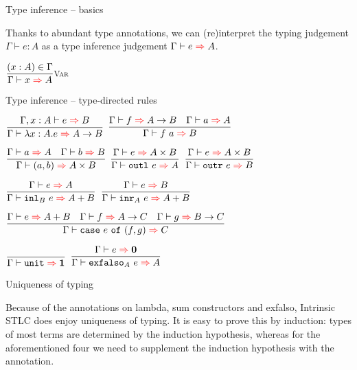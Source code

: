 \documentclass{beamer}
\newcommand{\Fun}[2]{#1 \to #2}
\newcommand{\Prod}[2]{#1 \times #2}
\newcommand{\Sum}[2]{#1 + #2}
\newcommand{\Unit}{\textbf{1}}
\newcommand{\Empty}{\textbf{0}}
\newcommand{\app}[2]{#1\ #2}
\newcommand{\pair}[2]{(#1, #2)}
\newcommand{\outl}[1]{\texttt{outl}\ #1}
\newcommand{\outr}[1]{\texttt{outr}\ #1}
\newcommand{\case}[3]{\texttt{case}\ #1\ \texttt{of}\ (#2, #3)}
\newcommand{\unit}{\texttt{unit}}
\newcommand{\fulltyping}[3]{#1 \vdash #2 : #3}
\newcommand{\rulename}[1]{\textsc{\footnotesize{#1}}}
\newcommand{\infrule}[3][]{\displaystyle \frac{#2}{#3} \rulename{#1}}
\newcommand{\extend}[3]{#1, #2 : #3}
\newcommand{\sidecond}[1]{#1}
\begin{document}
\begin{frame}{Type inference -- basics}

Thanks to abundant type annotations, we can (re)interpret the typing judgement $\fulltyping{\Gamma}{e}{A}$ as a type inference judgement $\fullinfer{\Gamma}{e}{A}$.

\vspace{2em}

\begin{center}
  $\infrule[Var]{\sidecond{(x : A) \in \Gamma}}{\infer{x}{A}}$
\end{center}

\end{frame}

\begin{frame}{Type inference -- type-directed rules}

\begin{center}
  $\infrule{\fullinfer{\extend{\Gamma}{x}{A}}{e}{B}}{\infer{\ifun{x}{A}{e}}{\Fun{A}{B}}}$ \quad
  $\infrule{\infer{f}{\Fun{A}{B}} \quad \infer{a}{A}}{\infer{\app{f}{a}}{B}}$

  \vspace{2em}

  $\infrule{\infer{a}{A} \quad \infer{b}{B}}{\infer{\pair{a}{b}}{\Prod{A}{B}}}$ \quad
  $\infrule{\infer{e}{\Prod{A}{B}}}{\infer{\outl{e}}{A}}$ \quad
  $\infrule{\infer{e}{\Prod{A}{B}}}{\infer{\outr{e}}{B}}$

  \vspace{2em}

  $\infrule{\infer{e}{A}}{\infer{\iinl{B}{e}}{\Sum{A}{B}}}$ \quad
  $\infrule{\infer{e}{B}}{\infer{\iinr{A}{e}}{\Sum{A}{B}}}$

  \vspace{2em}

  $\infrule{\infer{e}{\Sum{A}{B}} \quad \infer{f}{\Fun{A}{C}} \quad \infer{g}{\Fun{B}{C}}}{\infer{\case{e}{f}{g}}{C}}$

  \vspace{2em}

  $\infrule{}{\infer{\unit}{\Unit}}$ \quad
  $\infrule{\infer{e}{\Empty}}{\infer{\iexfalso{A}{e}}{A}}$
\end{center}

\end{frame}

\begin{frame}{Uniqueness of typing}

Because of the annotations on lambda, sum constructors and exfalso, Intrinsic STLC does enjoy uniqueness of typing. It is easy to prove this by induction: types of most terms are determined by the induction hypothesis, whereas for the aforementioned four we need to supplement the induction hypothesis with the annotation.

\end{frame}
\end{document}

